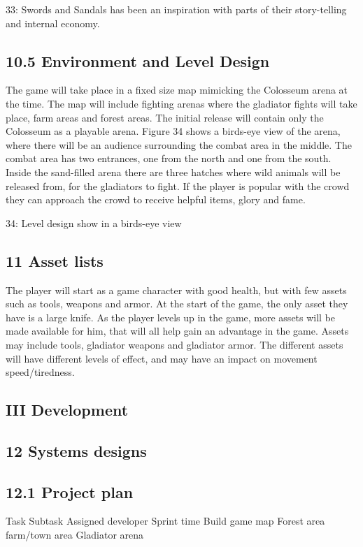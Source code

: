 \documentclass{article}
\begin{document}
\begin{titlepage}
{33: Swords and Sandals has been an inspiration with parts of their story-telling and internal economy. 

\subsection{ 10.5 Environment and Level Design }
The game will take place in a fixed size map mimicking the Colosseum arena at the time. The map will include fighting arenas where the gladiator fights will take place, farm areas and forest areas. The initial release will contain only the Colosseum as a playable arena. Figure 34 shows a birds-eye view of the arena, where there will be an audience surrounding the combat area in the middle. The combat area has two entrances, one from the north and one from the south. Inside the sand-filled arena there are three hatches where wild animals will be released from, for the gladiators to fight. If the player is popular with the crowd they can approach the crowd to receive helpful items, glory and fame.

34: Level design show in a birds-eye view


\subsection{ 11 Asset lists }
The player  will start as a game character with good health, but with few assets such as tools, weapons and armor. At the start of the game, the only asset they have is a large knife.  As the player levels up in the game, more assets will be made available for him, that will all help gain an advantage in the game. Assets may include tools, gladiator weapons and gladiator armor. The different assets will have different levels of effect, and may have an impact on movement speed/tiredness.

\subsection{ III Development }
\subsection{ 12 Systems designs }
\subsection{ 12.1 Project plan }

Task
Subtask 
Assigned developer
Sprint time
Build game map
Forest area
farm/town area
Gladiator arena


}
\end{titlepage}
\end{document}
